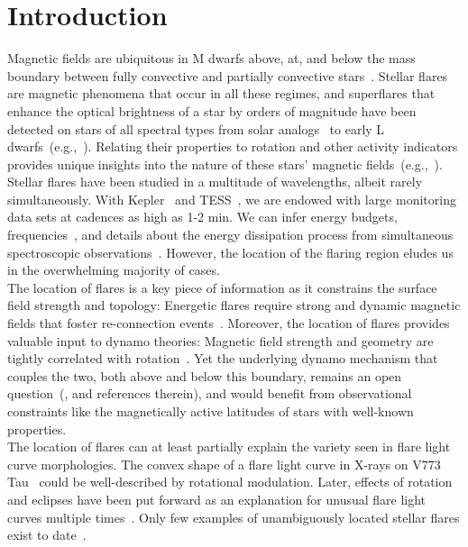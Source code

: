 \documentclass[fleqn,usenatbib,letters]{mnras}%
\begin{document}
\section{Introduction}
Magnetic fields are ubiquitous in M dwarfs above, at, and below the mass boundary \citep[$0.35M_\odot$;][]{chabrier1997} between fully convective and partially convective stars~\citep{morin2010, mclean2012}. Stellar flares are magnetic phenomena that occur in all these regimes, and superflares that enhance the optical brightness of a star by orders of magnitude have been detected on stars of all spectral types from solar analogs~\citep{maehara2012} to early L dwarfs~(e.g.,~\citealt{gizis2013}). Relating their properties to rotation and other activity indicators provides unique insights into the nature of these stars' magnetic fields~(e.g.,~\citealt{stelzer2016, paudel2018}).
\\
Stellar flares have been studied in a multitude of wavelengths, albeit rarely simultaneously. With Kepler~\citep{borucki2010} and TESS~\citep{ricker2015}, we are endowed with large monitoring data sets at cadences as high as 1-2 min. We can infer energy budgets, frequencies~\citep{davenport2016, yang2019, guenther2020}, and details about the energy dissipation process from simultaneous spectroscopic observations~\citep{silverberg2016}. However, the location of the flaring region eludes us in the overwhelming majority of cases.
\\
The location of flares is a key piece of information as it constrains the surface field strength and topology: Energetic flares require strong and dynamic magnetic fields that foster re-connection events~\citep{priest2002}. Moreover, the location of flares provides valuable input to dynamo theories: Magnetic field strength and geometry are tightly correlated with rotation~\citep{morin2008, morin2010, vidotto2014, see2019}. Yet the underlying dynamo mechanism that couples the two, both above and below this boundary, remains an open question~(\citealt{wright2018}, and references therein), and would benefit from observational constraints like the magnetically active latitudes of stars with well-known properties.
\\
The location of flares can at least partially explain the variety seen in flare light curve morphologies. The convex shape of a flare light curve in X-rays on V773 Tau~\citep{skinner1997} could be well-described by rotational modulation. Later, effects of rotation and eclipses have been put forward as an explanation for unusual flare light curves multiple times~\citep{stelzer1999,montmerle2000,johnstone2012}. Only few examples of unambiguously located stellar flares exist to date~\citep{wolter2008, peterson2010}.
\end{document}

